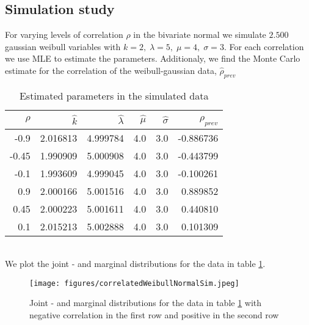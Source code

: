 \subsection{Simulation study}\label{simstudyappendix}
For varying levels of correlation $\rho$ in the bivariate normal we simulate $2.500$ gaussian weibull variables with $k=2, \; \lambda = 5, \; \mu = 4, \; \sigma = 3$. For each correlation we use MLE to estimate the parameters. Additionaly, we find the Monte Carlo estimate for the correlation of the weibull-gaussian data, $\hat{\rho}_{prev}$
\begin{table}[ht]
    \centering
    \begin{tabular}{rrrrrr}
          \hline
          $\rho$ & $\hat{k}$ & $\hat{\lambda}$ & $\hat{\mu}$ & $\hat{\sigma}$ & $\hat{\rho}_{prev}$\\ 
          \hline
        -0.9 & 2.016813 & 4.999784 & 4.0 & 3.0 & -0.886736 \\ 
          -0.45 & 1.990909 & 5.000908 & 4.0& 3.0 & -0.443799 \\ 
          -0.1 & 1.993609 & 4.999045 & 4.0 & 3.0 & -0.100261 \\ 
          0.9 & 2.000166 & 5.001516 & 4.0 & 3.0 & 0.889852 \\ 
          0.45 & 2.000223 & 5.001611 & 4.0 & 3.0 & 0.440810 \\ 
          0.1 & 2.015213 & 5.002888 & 4.0 & 3.0 & 0.101309 \\ 
           \hline
        \end{tabular}
    \caption{Estimated parameters in the simulated data}
    \label{correlationTable}
\end{table}\\
We plot the joint - and marginal distributions for the data in table \ref{correlationTable}.
\begin{figure}[h!]
        \begin{center}
        \texttt{[image: figures/correlatedWeibullNormalSim.jpeg]}
        \caption{Joint - and marginal distributions for the data in table \ref{correlationTable} with negative correlation in the first row and positive in the second row}
    \end{center}
    \label{correlationDensities1}
\end{figure}

